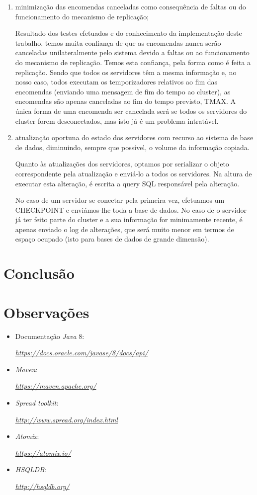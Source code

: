 \documentclass[a4paper]{report}
\begin{document}
{\begin{enumerate}
		\item minimização das encomendas canceladas como consequência de faltas ou do funcionamento do mecanismo de replicação;
		
		Resultado dos testes efetuados e do conhecimento da implementação deste trabalho, temos muita confiança de que as encomendas nunca serão canceladas unilateralmente pelo sistema devido a faltas ou ao funcionamento do mecanismo de replicação. Temos esta confiança, pela forma como é feita a replicação. Sendo que todos os servidores têm a mesma informação e, no nosso caso, todos executam os temporizadores relativos ao fim das encomendas (enviando uma mensagem de fim do tempo ao cluster), as encomendas são apenas canceladas ao fim do tempo previsto, TMAX. A única forma de uma encomenda ser cancelada será se todos os servidores do cluster forem desconectados, mas isto já é um problema intratável.
		
		\item atualização oportuna do estado dos servidores com recurso ao sistema de base de dados, diminuindo, sempre que possível, o volume da informação copiada.
		
		Quanto às atualizações dos servidores, optamos por serializar o objeto correspondente pela atualização e enviá-lo a todos os servidores. Na altura de executar esta alteração, é escrita a query SQL responsável pela alteração.
		
		No caso de um servidor se conectar pela primeira vez, efetuamos um CHECKPOINT e enviámos-lhe toda a base de dados. No caso de o servidor já ter feito parte do cluster e a sua informação for minimamente recente, é apenas enviado o log de alterações, que será muito menor em termos de espaço ocupado (isto para bases de dados de grande dimensão).
		
	\end{enumerate}
}

\chapter{Conclusão} \label{ch:Conclusion}
\large{
	
}

\appendix
\chapter{Observações} \label{ch:Observations}
\begin{itemize}
    \item Documentação \textit{Java} 8:
    \par \textit{\url{https://docs.oracle.com/javase/8/docs/api/}}
	\item \textit{Maven}:
	\par \textit{\url{https://maven.apache.org/}}
	\item \textit{Spread toolkit}:
	\par \textit{\url{http://www.spread.org/index.html}}
	\item \textit{Atomix}:
	\par \textit{\url{https://atomix.io/}}
	\item \textit{HSQLDB}:
	\par \textit{\url{http://hsqldb.org/}}
\end{itemize}
\end{document}
